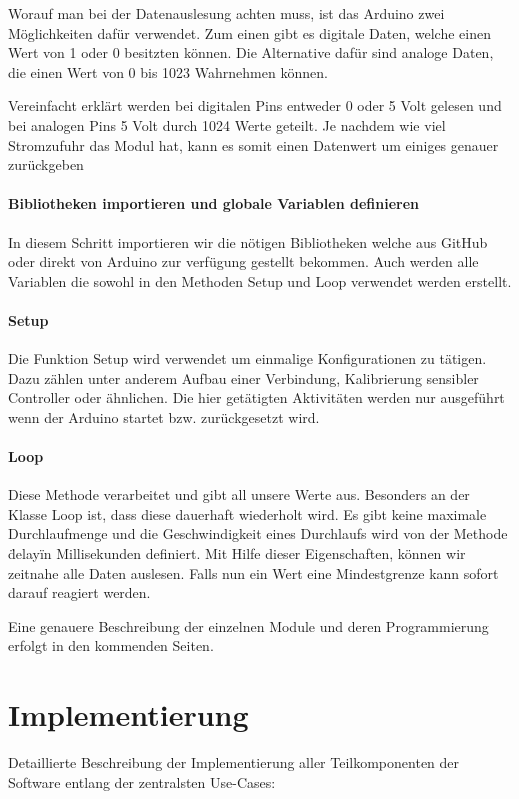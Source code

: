 Worauf man bei der Datenauslesung achten muss, ist das Arduino  zwei Möglichkeiten dafür verwendet. Zum einen gibt es digitale Daten, welche einen Wert von 1 oder 0 besitzten können. Die Alternative dafür sind analoge Daten, die einen Wert von 0 bis 1023 Wahrnehmen können.

Vereinfacht erklärt werden bei digitalen Pins entweder 0 oder 5 Volt gelesen und bei analogen Pins 5 Volt durch 1024 Werte geteilt. Je nachdem wie viel Stromzufuhr das Modul hat, kann es somit einen Datenwert um einiges genauer zurückgeben
\cite{analogRead}




\subsubsection{Bibliotheken importieren und globale Variablen definieren}

In diesem Schritt importieren wir die nötigen Bibliotheken welche aus GitHub oder direkt von Arduino zur verfügung gestellt bekommen. Auch werden alle Variablen die sowohl in den Methoden Setup und Loop verwendet werden erstellt. 

\subsubsection{Setup}

Die Funktion Setup wird verwendet um einmalige Konfigurationen zu tätigen. Dazu zählen unter anderem Aufbau einer Verbindung, Kalibrierung sensibler Controller oder ähnlichen. Die hier getätigten Aktivitäten werden nur ausgeführt wenn der Arduino startet bzw. zurückgesetzt wird.

\subsubsection{Loop}

Diese Methode verarbeitet und gibt all unsere Werte aus. Besonders an der Klasse Loop ist, dass diese dauerhaft wiederholt wird. Es gibt keine maximale Durchlaufmenge und die Geschwindigkeit eines Durchlaufs wird von der Methode \"delay\" in Millisekunden definiert. Mit Hilfe dieser Eigenschaften, können wir zeitnahe alle Daten auslesen. Falls nun ein Wert eine Mindestgrenze kann sofort darauf reagiert werden. 

Eine genauere Beschreibung der einzelnen Module und deren Programmierung erfolgt in den kommenden Seiten.


\chapter{Implementierung}
Detaillierte Beschreibung der Implementierung aller Teilkomponenten der Software entlang der zentralsten Use-Cases:

